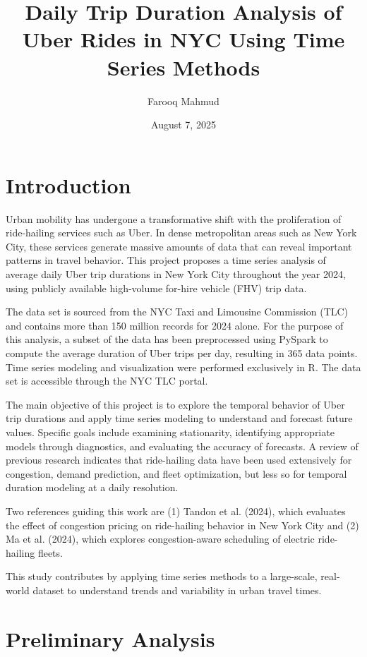 \documentclass{article}
\title{Daily Trip Duration Analysis of Uber Rides in NYC Using Time Series Methods }
\author{
    Farooq Mahmud
}
\date{August 7, 2025}
\begin{document}
\maketitle

\section{Introduction}
Urban mobility has undergone a transformative shift with the proliferation of ride-hailing services such as Uber. In dense metropolitan areas such as New York City, these services generate massive amounts of data that can reveal important patterns in travel behavior. This project proposes a time series analysis of average daily Uber trip durations in New York City throughout the year 2024, using publicly available high-volume for-hire vehicle (FHV) trip data.

The data set is sourced from the NYC Taxi and Limousine Commission (TLC) and contains more than 150 million records for 2024 alone. For the purpose of this analysis, a subset of the data has been preprocessed using PySpark to compute the average duration of Uber trips per day, resulting in 365 data points. Time series modeling and visualization were performed exclusively in R. The data set is accessible through the NYC TLC portal\cite{nyctlc2024}.

The main objective of this project is to explore the temporal behavior of Uber trip durations and apply time series modeling to understand and forecast future values. Specific goals include examining stationarity, identifying appropriate models through diagnostics, and evaluating the accuracy of forecasts. A review of previous research indicates that ride-hailing data have been used extensively for congestion, demand prediction, and fleet optimization, but less so for temporal duration modeling at a daily resolution.

Two references guiding this work are (1) Tandon et al. (2024), which evaluates the effect of congestion pricing on ride-hailing behavior in New York City\cite{tandon2024congestion} and (2) Ma et al. (2024), which explores congestion-aware scheduling of electric ride-hailing fleets\cite{ma2024congestion}.

This study contributes by applying time series methods to a large-scale, real-world dataset to understand trends and variability in urban travel times.

\section{Preliminary Analysis}
\end{document}
